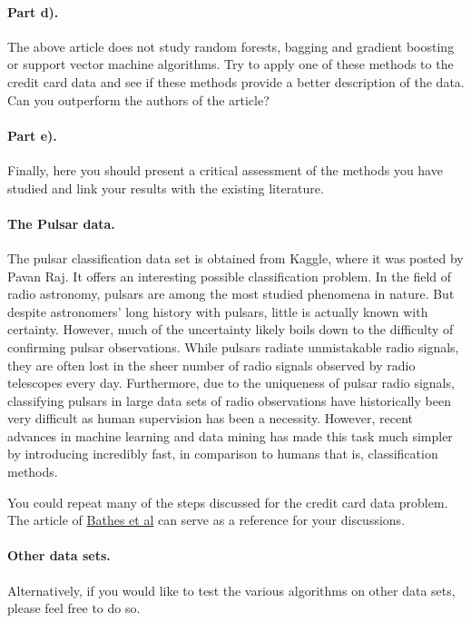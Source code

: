 \documentclass[%
oneside,                 %
final,                   %
10pt]{article}
\begin{document}
\paragraph{Part d).}
The above article does not study random forests, bagging and gradient boosting or support vector
machine algorithms. Try to apply one of these methods to the
credit card data and see if these methods provide a better description
of the data. Can you outperform the authors of the article?

\paragraph{Part e).}
Finally, here you should present a critical assessment of the methods
you have studied and link your results with the existing literature.

\paragraph{The Pulsar data.}
The pulsar classification data set is obtained from
Kaggle, where it was posted by Pavan Raj. It offers an interesting
possible classification problem. In the field of radio astronomy,
pulsars are among the most studied phenomena in nature. But despite
astronomers' long history with pulsars, little is actually known with
certainty. However, much of the uncertainty likely boils down to the
difficulty of confirming pulsar observations. While pulsars radiate
unmistakable radio signals, they are often lost in the sheer number of
radio signals observed by radio telescopes every day. Furthermore, due
to the uniqueness of pulsar radio signals, classifying pulsars in
large data sets of radio observations have historically been very
difficult as human supervision has been a necessity. However, recent
advances in machine learning and data mining has made this task
much simpler by introducing incredibly fast, in comparison to humans
that is, classification methods.

You could repeat many of the steps discussed for the credit card data problem.
The article of \href{{https://arxiv.org/abs/1209.0793}}{Bathes et al} can serve as a reference for your discussions.

\paragraph{Other data sets.}
Alternatively, if you would like to test the various algorithms on other data sets, please feel free to do so.
\end{document}
